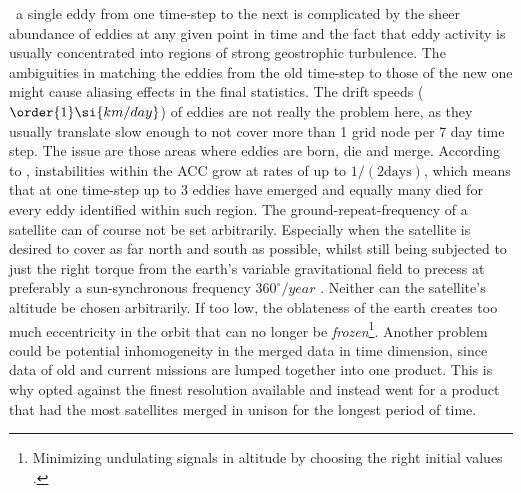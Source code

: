 ~a single eddy from one time-step to the next is complicated by the sheer abundance of eddies at any given point in time and the fact that eddy activity is usually concentrated into regions of strong geostrophic turbulence.
The ambiguities in matching the eddies from the old time-step to those of the new one might cause aliasing effects in the final statistics. The drift speeds ($\order{1}\si{km/day}$) of eddies are not really the problem here, as they usually translate slow enough to not cover more
than 1 grid node per 7 day time step. The issue are those areas where eddies are born, die and merge. According to \citet{Smith2009}, instabilities within the ACC
grow at rates of up to $1/(2 \mathrm{days})$, which means that at one time-step up to 3 eddies have emerged and equally many died for every eddy identified within
such region. The ground-repeat-frequency of a satellite can of course not be set arbitrarily. Especially when the satellite is desired to cover as far north and
south as possible, whilst still being subjected to just the right torque from the earth's variable gravitational field to precess at preferably a
sun-synchronous frequency \ie $360^{\circ}/year$ \citep{goldreich1965inclination}. Neither can the
satellite's altitude be chosen arbitrarily. If too low, the oblateness of the earth creates too much eccentricity in the orbit that can no longer be
\textit{frozen}\footnote{Minimizing undulating signals in altitude by choosing the right initial values \citep{goldreich1965inclination}.}. Another problem could be potential inhomogeneity in
the merged data in time dimension, since data of old and current missions are lumped together into one product. This is why \citet{Chelton2011} opted against
the finest resolution available and instead went for a product that had the most satellites merged in unison for the longest period of time.
